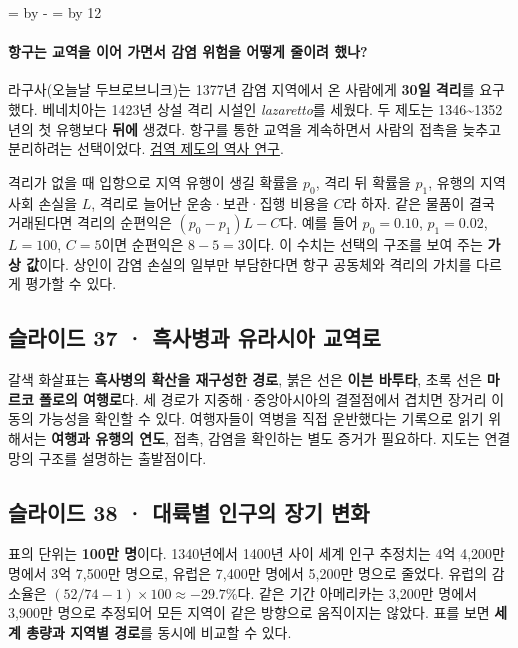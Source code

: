 \documentclass[10pt,a4paper]{article}
\newcommand{\ReserveQuestionSpace}{%
  \par\begingroup
  \dimen0=\pagegoal \advance\dimen0 by -\pagetotal
  \dimen2=\baselineskip \multiply\dimen2 by 12
  \ifdim\dimen0<\dimen2 \newpage\fi
  \endgroup}
\begin{document}
\ReserveQuestionSpace
\paragraph{항구는 교역을 이어 가면서 감염 위험을 어떻게 줄이려 했나?}
라구사(오늘날 두브로브니크)는 1377년 감염 지역에서 온 사람에게 \textbf{30일 격리}를 요구했다. 베네치아는 1423년 상설 격리 시설인 \emph{lazaretto}를 세웠다. 두 제도는 1346\textasciitilde{}1352년의 첫 유행보다 \textbf{뒤에} 생겼다. 항구를 통한 교역을 계속하면서 사람의 접촉을 늦추고 분리하려는 선택이었다. \href{https://www.cambridge.org/core/journals/historical-journal/article/quarantine-diseased-geographies-and-crosscultural-encounters-in-the-eighteenthcentury-mediterranean/D23885F7D9796F6C78538B066BE130F7}{검역 제도의 역사 연구}.\par

격리가 없을 때 입항으로 지역 유행이 생길 확률을 $p_0$, 격리 뒤 확률을 $p_1$, 유행의 지역사회 손실을 $L$, 격리로 늘어난 운송·보관·집행 비용을 $C$라 하자. 같은 물품이 결국 거래된다면 격리의 순편익은 $(p_0-p_1)L-C$다. 예를 들어 $p_0=0.10$, $p_1=0.02$, $L=100$, $C=5$이면 순편익은 $8-5=3$이다. 이 수치는 선택의 구조를 보여 주는 \textbf{가상 값}이다. 상인이 감염 손실의 일부만 부담한다면 항구 공동체와 격리의 가치를 다르게 평가할 수 있다.\par

\subsection{슬라이드 37 · 흑사병과 유라시아 교역로}
갈색 화살표는 \textbf{흑사병의 확산을 재구성한 경로}, 붉은 선은 \textbf{이븐 바투타}, 초록 선은 \textbf{마르코 폴로의 여행로}다. 세 경로가 지중해·중앙아시아의 결절점에서 겹치면 장거리 이동의 가능성을 확인할 수 있다. 여행자들이 역병을 직접 운반했다는 기록으로 읽기 위해서는 \textbf{여행과 유행의 연도}, 접촉, 감염을 확인하는 별도 증거가 필요하다. 지도는 연결망의 구조를 설명하는 출발점이다.\par

\subsection{슬라이드 38 · 대륙별 인구의 장기 변화}
표의 단위는 \textbf{100만 명}이다. 1340년에서 1400년 사이 세계 인구 추정치는 4억 4,200만 명에서 3억 7,500만 명으로, 유럽은 7,400만 명에서 5,200만 명으로 줄었다. 유럽의 감소율은 $(52/74-1)\times100\approx-29.7\%$다. 같은 기간 아메리카는 3,200만 명에서 3,900만 명으로 추정되어 모든 지역이 같은 방향으로 움직이지는 않았다. 표를 보면 \textbf{세계 총량과 지역별 경로}를 동시에 비교할 수 있다.\par
\end{document}
